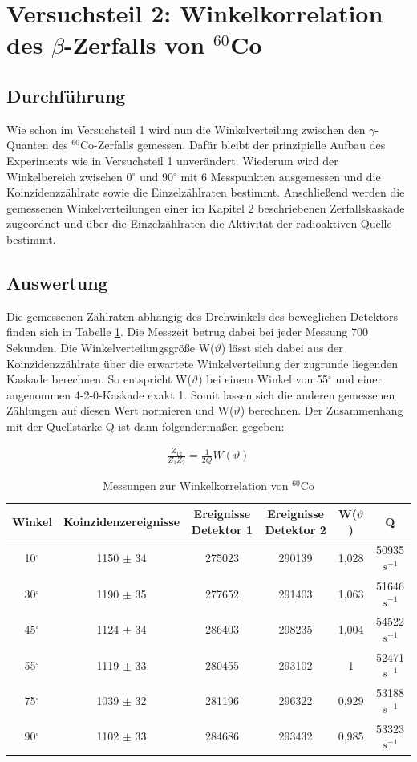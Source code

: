 \documentclass[11pt]{scrartcl}
\begin{document}
\section{Versuchsteil 2: Winkelkorrelation des $\beta$-Zerfalls von $^{60}$Co}

\subsection{Durchführung}

Wie schon im Versuchsteil 1 wird nun die Winkelverteilung zwischen den $\gamma$-Quanten des $^{60}$Co-Zerfalls gemessen. Dafür bleibt der prinzipielle Aufbau des Experiments wie in Versuchsteil 1 unverändert. Wiederum wird der Winkelbereich zwischen 0$^\circ$ und 90$^\circ$ mit 6 Messpunkten ausgemessen und die Koinzidenzzählrate sowie die Einzelzählraten bestimmt. Anschließend werden die gemessenen Winkelverteilungen einer im Kapitel 2 beschriebenen Zerfallskaskade zugeordnet und über die Einzelzählraten die Aktivität der radioaktiven Quelle bestimmt. 

\subsection{Auswertung}
Die gemessenen Zählraten abhängig des Drehwinkels des beweglichen Detektors finden sich in Tabelle \ref{Quelle}. Die Messzeit betrug dabei bei jeder Messung 700 Sekunden. Die Winkelverteilungsgröße W($\vartheta$) lässt sich dabei aus der Koinzidenzzählrate über die erwartete Winkelverteilung der zugrunde liegenden Kaskade berechnen. So entspricht W($\vartheta$) bei einem Winkel von 55$^\circ$ und einer angenommen 4-2-0-Kaskade exakt 1. Somit lassen sich die anderen gemessenen Zählungen auf diesen Wert normieren und W($\vartheta$) berechnen. Der Zusammenhang mit der Quellstärke Q ist dann folgendermaßen gegeben:

\begin{align}
\frac{Z_{12}}{Z_1Z_2}=\frac{1}{2Q}W(\vartheta)
\end{align}

\begin{table}[h]
	\caption{Messungen zur Winkelkorrelation von $^{60}$Co}
	\begin{tabular}{|c|c|c|c|c|c|}
	\hline
	 Winkel & Koinzidenzereignisse & Ereignisse Detektor 1 & Ereignisse Detektor 2 & W($\vartheta$) & Q\\ \hline
	 10$^\circ$ & 1150 $\pm$ 34 & 275023 & 290139 & 1,028 & 50935 $s^{-1}$\\ \hline
	 30$^\circ$ & 1190 $\pm$ 35 & 277652 & 291403 & 1,063 & 51646 $s^{-1}$\\ \hline
	 45$^\circ$ & 1124 $\pm$ 34 & 286403 & 298235 & 1,004 & 54522 $s^{-1}$\\ \hline
	 55$^\circ$ & 1119 $\pm$ 33 & 280455 & 293102 & 1 & 52471 $s^{-1}$\\ \hline
	 75$^\circ$ & 1039 $\pm$ 32 & 281196 & 296322 & 0,929 & 53188 $s^{-1}$\\ \hline
	 90$^\circ$ & 1102 $\pm$ 33 & 284686 & 293432 & 0,985 & 53323 $s^{-1}$\\ \hline
	\end{tabular}
\label{Quelle}
\end{table}
\end{document}
